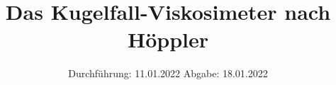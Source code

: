 

\subject{V 107}
\title{Das Kugelfall-Viskosimeter nach Höppler}
\date{%
  Durchführung: 11.01.2022
  \hspace{3em}
  Abgabe: 18.01.2022
}



\maketitle
\thispagestyle{empty}
\tableofcontents
\newpage







\printbibliography{}


